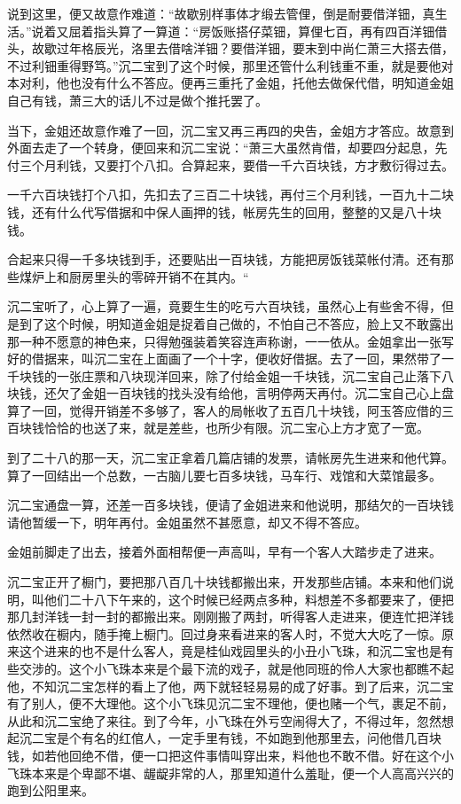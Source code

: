 \documentclass[12pt,UTF8]{ctexbook}
\begin{document}
{{{说到这里，便又故意作难道：“故歇别样事体才缎去管俚，倒是耐要借洋钿，真生活。”说着又屈着指头算了一算道：“房饭账搭仔菜钿，算俚七百，再有四百洋钿借头，故歇过年格辰光，洛里去借啥洋钿？要借洋钿，要末到中尚仁萧三大搭去借，不过利钿重得野笃。”沉二宝到了这个时候，那里还管什么利钱重不重，就是要他对本对利，他也没有什么不答应。便再三重托了金姐，托他去做保代借，明知道金姐自己有钱，萧三大的话儿不过是做个推托罢了。

当下，金姐还故意作难了一回，沉二宝又再三再四的央告，金姐方才答应。故意到外面去走了一个转身，便回来和沉二宝说：“萧三大虽然肯借，却要四分起息，先付三个月利钱，又要打个八扣。合算起来，要借一千六百块钱，方才敷衍得过去。

一千六百块钱打个八扣，先扣去了三百二十块钱，再付三个月利钱，一百九十二块钱，还有什么代写借据和中保人画押的钱，帐房先生的回用，整整的又是八十块钱。

合起来只得一千多块钱到手，还要贴出一百块钱，方能把房饭钱菜帐付清。还有那些煤炉上和厨房里头的零碎开销不在其内。“

沉二宝听了，心上算了一遍，竟要生生的吃亏六百块钱，虽然心上有些舍不得，但是到了这个时候，明知道金姐是捉着自己做的，不怕自己不答应，脸上又不敢露出那一种不愿意的神色来，只得勉强装着笑容连声称谢，一一依从。金姐拿出一张写好的借据来，叫沉二宝在上面画了一个十字，便收好借据。去了一回，果然带了一千块钱的一张庄票和八块现洋回来，除了付给金姐一千块钱，沉二宝自己止落下八块钱，还欠了金姐一百块钱的找头没有给他，言明停两天再付。沉二宝自己心上盘算了一回，觉得开销差不多够了，客人的局帐收了五百几十块钱，阿玉答应借的三百块钱恰恰的也送了来，就是差些，也所少有限。沉二宝心上方才宽了一宽。

到了二十八的那一天，沉二宝正拿着几篇店铺的发票，请帐房先生进来和他代算。算了一回结出一个总数，一古脑儿要七百多块钱，马车行、戏馆和大菜馆最多。

沉二宝通盘一算，还差一百多块钱，便请了金姐进来和他说明，那结欠的一百块钱请他暂缓一下，明年再付。金姐虽然不甚愿意，却又不得不答应。

金姐前脚走了出去，接着外面相帮便一声高叫，早有一个客人大踏步走了进来。

沉二宝正开了橱门，要把那八百几十块钱都搬出来，开发那些店铺。本来和他们说明，叫他们二十八下午来的，这个时候已经两点多种，料想差不多都要来了，便把那几封洋钱一封一封的都搬出来。刚刚搬了两封，听得客人走进来，便连忙把洋钱依然收在橱内，随手掩上橱门。回过身来看进来的客人时，不觉大大吃了一惊。原来这个进来的也不是什么客人，竟是桂仙戏园里头的小丑小飞珠，和沉二宝也是有些交涉的。这个小飞珠本来是个最下流的戏子，就是他同班的伶人大家也都瞧不起他，不知沉二宝怎样的看上了他，两下就轻轻易易的成了好事。到了后来，沉二宝有了别人，便不大理他。这个小飞珠见沉二宝不理他，便也赌一个气，裹足不前，从此和沉二宝绝了来往。到了今年，小飞珠在外亏空闹得大了，不得过年，忽然想起沉二宝是个有名的红倌人，一定手里有钱，不如跑到他那里去，问他借几百块钱，如若他回绝不借，便一口把这件事情叫穿出来，料他也不敢不借。好在这个小飞珠本来是个卑鄙不堪、龌龊非常的人，那里知道什么羞耻，便一个人高高兴兴的跑到公阳里来。

}}}
\end{document}
